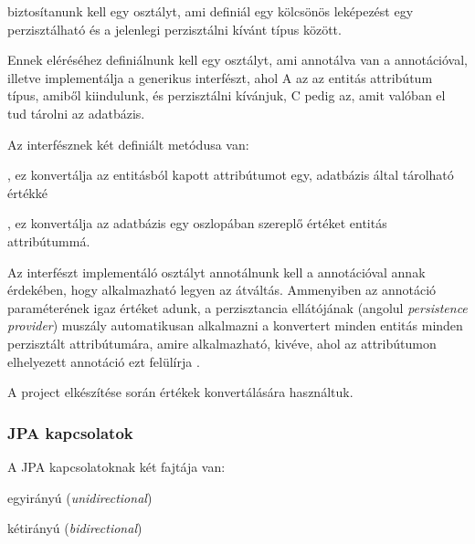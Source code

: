 \noindent biztosítanunk kell egy osztályt, ami definiál egy kölcsönös leképezést egy perzisztálható és a jelenlegi perzisztálni kívánt típus között. \par

Ennek eléréséhez definiálnunk kell egy osztályt, ami annotálva van a  annotációval, illetve implementálja a  generikus interfészt, ahol A az az entitás attribútum típus, amiből kiindulunk, és perzisztálni kívánjuk, C pedig az, amit valóban el tud tárolni az adatbázis. \par

Az  interfésznek két definiált metódusa van:

\begin{listing}
	\item {}, ez konvertálja az entitásból kapott attribútumot egy, adatbázis által tárolható értékké
	\item {}, ez konvertálja az adatbázis egy oszlopában szereplő értéket entitás attribútummá.
\end{listing}

Az interfészt implementáló osztályt annotálnunk kell a  annotációval annak érdekében, hogy alkalmazható legyen az átváltás. Ammenyiben az annotáció  paraméterének igaz értéket adunk, a perzisztancia ellátójának (angolul \emph{persistence provider}) muszály automatikusan alkalmazni a konvertert minden entitás minden perzisztált attribútumára, amire alkalmazható, kivéve, ahol az attribútumon elhelyezett  annotáció ezt felülírja \cite{converterDocumentation}.

A project elkészítése során  értékek konvertálására használtuk.


\subsubsection{JPA kapcsolatok}

A JPA kapcsolatoknak két fajtája van:
\begin{listing}
	\item egyirányú (\emph{unidirectional})
	\item kétirányú (\emph{bidirectional})
\end{listing}

